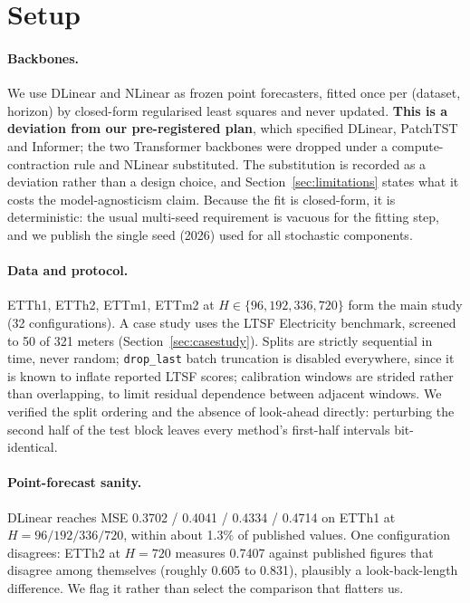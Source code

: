 \documentclass[11pt]{article}
\begin{document}
\section{Setup}\label{sec:setup}

\paragraph{Backbones.} We use DLinear \citep{dlinear} and NLinear as frozen point forecasters, fitted once per (dataset, horizon) by closed-form regularised least squares and never updated. \textbf{This is a deviation from our pre-registered plan}, which specified DLinear, PatchTST and Informer; the two Transformer backbones were dropped under a compute-contraction rule and NLinear substituted. The substitution is recorded as a deviation rather than a design choice, and Section~\ref{sec:limitations} states what it costs the model-agnosticism claim. Because the fit is closed-form, it is deterministic: the usual multi-seed requirement is vacuous for the fitting step, and we publish the single seed (2026) used for all stochastic components.

\paragraph{Data and protocol.} ETTh1, ETTh2, ETTm1, ETTm2 at $H \in \{96,192,336,720\}$ form the main study (32 configurations). A case study uses the LTSF Electricity benchmark, screened to 50 of 321 meters (Section~\ref{sec:casestudy}). Splits are strictly sequential in time, never random; \texttt{drop\_last} batch truncation is disabled everywhere, since it is known to inflate reported LTSF scores; calibration windows are strided rather than overlapping, to limit residual dependence between adjacent windows. We verified the split ordering and the absence of look-ahead directly: perturbing the second half of the test block leaves every method's first-half intervals bit-identical.

\paragraph{Point-forecast sanity.} DLinear reaches MSE 0.3702 / 0.4041 / 0.4334 / 0.4714 on ETTh1 at $H=96/192/336/720$, within about 1.3\% of published values. One configuration disagrees: ETTh2 at $H=720$ measures 0.7407 against published figures that disagree among themselves (roughly 0.605 to 0.831), plausibly a look-back-length difference. We flag it rather than select the comparison that flatters us.
\end{document}
